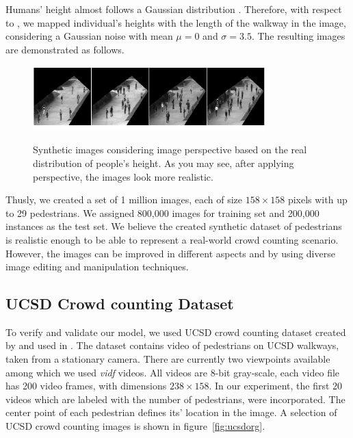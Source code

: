 \begin{itemize}
Humans' height almost follows a Gaussian distribution \cite{subramanian2011height}. Therefore, with respect to \cite{subramanian2011height, garcia2007evolution}, we mapped individual's heights with the length of the walkway in the image, considering a Gaussian noise with mean $\mu = 0$ and $\sigma = 3.5$. The resulting images are demonstrated as follows.

\begin{figure}[H]
	\centering
	{\includegraphics[width=0.8\textwidth]{images/pers}}
	\caption{Synthetic images considering image perspective based on the real distribution of people's height. As you may see, after applying perspective, the images look more realistic. }
	\label{fig:pers}
\end{figure}


\end{itemize}

\noindent Thusly, we created a set of 1 million images, each of size $158\times158$ pixels with up to 29 pedestrians. We assigned 800,000 images for training set and 200,000 instances as the test set. We believe the created synthetic dataset of pedestrians is realistic enough to be able to represent a real-world crowd counting scenario. However, the images can be improved in different aspects and by using diverse image editing and manipulation techniques. 

\subsection{UCSD Crowd counting Dataset}
\label{subsec:datareal2}
To verify and validate our model, we used UCSD crowd counting dataset created by \citeauthor*{chan2008privacy} and used in \cite{chan2008privacy,chan2009bayesian,chan2012counting}. The dataset contains video of pedestrians on UCSD walkways, taken from a stationary camera. There are currently two  viewpoints available among which we used \textit{vidf} videos. All videos are 8-bit gray-scale, each video file has 200 video frames, with dimensions $238\times158$. In our experiment, the first 20 videos which are labeled with the number of pedestrians, were incorporated. The center point of each pedestrian defines its' location in the image. A selection of UCSD crowd counting images is shown in figure~\ref{fig:ucsdorg}.

